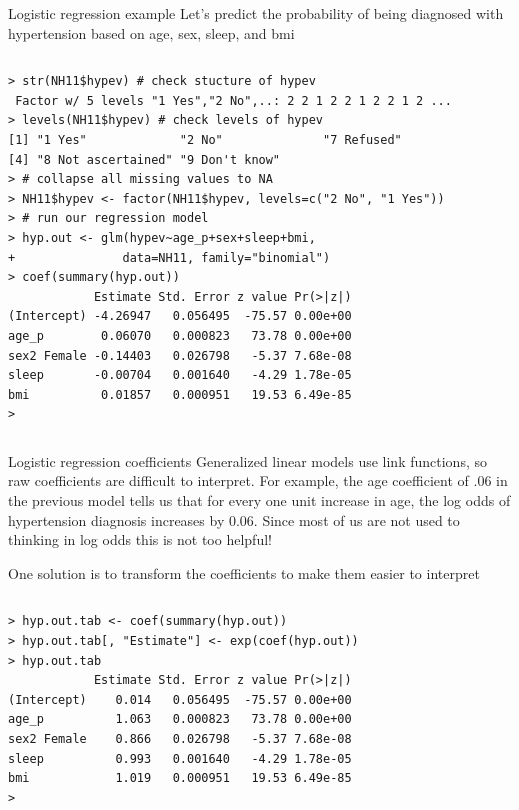 \documentclass[table,smaller]{beamer}
\begin{document}
\begin{frame}[fragile,label=sec-4-2]{Logistic regression example}
 Let's predict the probability of being diagnosed with hypertension based on age, sex, sleep, and bmi

\vspace{-.5em}
\begin{columns}
\begin{block}{}
\begin{verbatim}
> str(NH11$hypev) # check stucture of hypev
 Factor w/ 5 levels "1 Yes","2 No",..: 2 2 1 2 2 1 2 2 1 2 ...
> levels(NH11$hypev) # check levels of hypev
[1] "1 Yes"             "2 No"              "7 Refused"        
[4] "8 Not ascertained" "9 Don't know"     
> # collapse all missing values to NA
> NH11$hypev <- factor(NH11$hypev, levels=c("2 No", "1 Yes"))
> # run our regression model
> hyp.out <- glm(hypev~age_p+sex+sleep+bmi,
+               data=NH11, family="binomial")
> coef(summary(hyp.out))
            Estimate Std. Error z value Pr(>|z|)
(Intercept) -4.26947   0.056495  -75.57 0.00e+00
age_p        0.06070   0.000823   73.78 0.00e+00
sex2 Female -0.14403   0.026798   -5.37 7.68e-08
sleep       -0.00704   0.001640   -4.29 1.78e-05
bmi          0.01857   0.000951   19.53 6.49e-85
>
\end{verbatim}
\end{block}
\end{columns}
\vspace{.5em}
\end{frame}

\begin{frame}[fragile,label=sec-4-3]{Logistic regression coefficients}
 Generalized linear models use link functions, so raw coefficients are difficult to interpret. For example, the age coefficient of .06 in the previous model tells us that for every one unit increase in age, the log odds of hypertension diagnosis increases by 0.06. Since most of us are not used to thinking in log odds this is not too helpful!

One solution is to transform the coefficients to make them easier to interpret

\vspace{-.5em}
\begin{columns}
\begin{block}{}
\begin{verbatim}
> hyp.out.tab <- coef(summary(hyp.out))
> hyp.out.tab[, "Estimate"] <- exp(coef(hyp.out))
> hyp.out.tab
            Estimate Std. Error z value Pr(>|z|)
(Intercept)    0.014   0.056495  -75.57 0.00e+00
age_p          1.063   0.000823   73.78 0.00e+00
sex2 Female    0.866   0.026798   -5.37 7.68e-08
sleep          0.993   0.001640   -4.29 1.78e-05
bmi            1.019   0.000951   19.53 6.49e-85
>
\end{verbatim}
\end{block}
\end{columns}
\vspace{.5em}
\end{frame}
\end{document}

